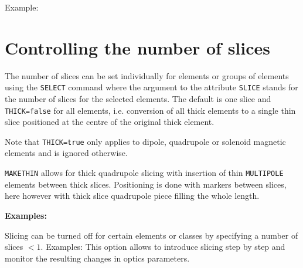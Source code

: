 Example:

\section{Controlling the number of slices}
\label{sec:numberofslices}

The number of slices can be set individually for elements or groups of
elements using the \texttt{SELECT} command
where the argument to the attribute \texttt{SLICE} stands for the number of
slices for the selected elements. The default is one slice and
\texttt{THICK=false} for all elements, i.e. conversion of all thick
elements to a single thin slice positioned at the centre of the original
thick element.

Note that \texttt{THICK=true} only applies to dipole, quadrupole or solenoid magnetic
elements and is ignored otherwise.

\texttt{MAKETHIN} allows for thick quadrupole slicing with insertion of
thin \texttt{MULTIPOLE} elements between thick slices. 
Positioning is done with markers between
slices, here however with thick slice quadrupole piece filling the whole
length.

\textbf{Examples:}

Slicing can be turned off for certain elements or classes by specifying
a number of slices $< 1$. Examples: 
This option allows to introduce slicing step by step and monitor the 
resulting changes in optics parameters.

